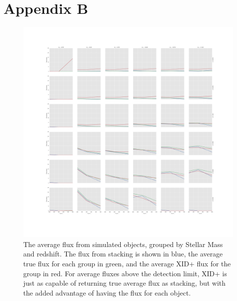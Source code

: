 \documentclass[useAMS,usenatbib]{mnras}
\begin{document}
\section*{Appendix B}\label{stacking_app}
\begin{figure}[b]
\onecolumn
\includegraphics[width=18cm]{Stacking.pdf}
\caption{The average flux from simulated objects, grouped by Stellar Mass and redshift. The flux from stacking is shown in blue, the average true flux for each group in green, and the average \textsc{XID+} flux for the group in red. For average fluxes above the detection limit, \textsc{XID+} is just as capable of returning true average flux as stacking, but with the added advantage of having the flux for each object.}\label{fig:stack}
\end{figure}


%
%
%
%
%
%
\end{document}

